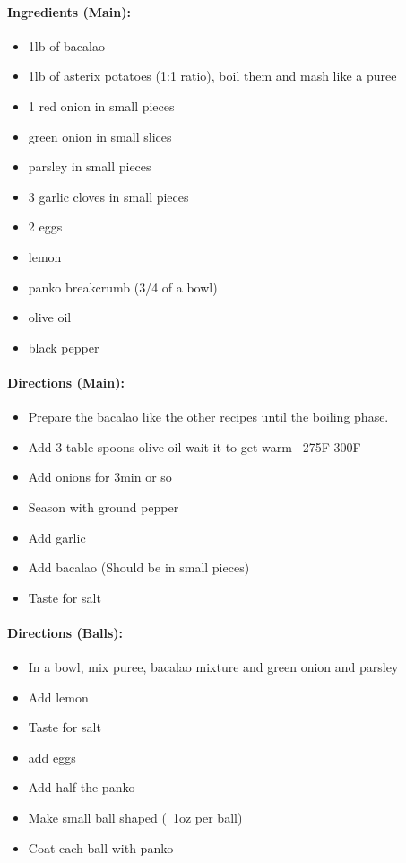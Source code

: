 \documentclass{article}
\begin{document}
\paragraph{Ingredients (Main):}
\begin{itemize}
    \item 1lb of bacalao
    \item 1lb of asterix potatoes (1:1 ratio), boil them and mash like a puree
    \item 1 red onion in small pieces
    \item green onion in small slices
    \item parsley in small pieces
    \item 3 garlic cloves in small pieces
    \item 2 eggs
    \item lemon
    \item panko breakcrumb (3/4 of a bowl)
    \item olive oil
    \item black pepper
\end{itemize}      

\paragraph{Directions (Main):}
\begin{itemize}
    \item Prepare the bacalao like the other recipes until the boiling phase.
    \item Add 3 table spoons olive oil wait it to get warm ~275F-300F
    \item Add onions for 3min or so
    \item Season with ground pepper
    \item Add garlic
    \item Add bacalao (Should be in small pieces)
    \item Taste for salt
\end{itemize}  

\paragraph{Directions (Balls):}
\begin{itemize}
    \item In a bowl, mix puree, bacalao mixture and green onion and parsley
    \item Add lemon
    \item Taste for salt
    \item add  eggs
    \item Add half the panko
    \item Make small ball shaped (~1oz per ball)
    \item Coat each ball with panko
\end{itemize}  
\end{document}
